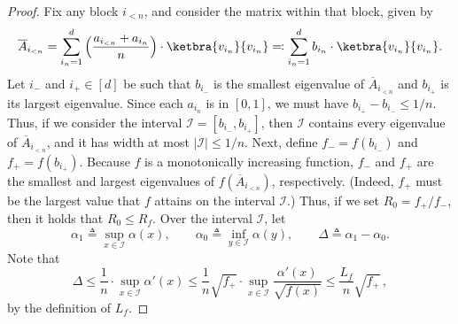 \documentclass[10pt]{article}
\newcommand{\lift}[1]{\overline{#1}}
\begin{document}
\begin{proof}
    Fix any block $i_{<n}$, and consider the matrix within that block, given by
    \begin{equation*}
        \lift{A}_{i_{< n}} = \sum_{i_n=1}^d \Big(\frac{a_{i_{<n}} + a_{i_n}}{n}\Big)\cdot \ketbra{v_{i_n}}{v_{i_n}}
        \eqqcolon \sum_{i_n=1}^d b_{i_n} \cdot \ketbra{v_{i_n}}{v_{i_n}}.
    \end{equation*}
    Let $i_-$ and $i_+ \in [d]$ be such that $b_{i_-}$ is the smallest eigenvalue of $\lift{A}_{i_{<n}}$ and $b_{i_+}$ is its largest eigenvalue.
    Since each $a_{i_n}$ is in $[0, 1]$, we must have $b_{i_+} - b_{i_-} \leq 1/n$.
    Thus, if we consider the interval $\mathcal{I} = [b_{i_-}, b_{i_+}]$, then $\mathcal{I}$ contains every eigenvalue of $\lift{A}_{i_{< n}}$, and it has width at most $|\mathcal{I}| \leq 1/n$.
    Next, define $f_- = f(b_{i_-})$ and $f_+ = f(b_{i_+})$.
    Because $f$ is a monotonically increasing function, $f_-$ and $f_+$ are the smallest and largest eigenvalues of $f(\lift{A}_{i_{< n}})$, respectively.
    (Indeed, $f_+$ must be the largest value that $f$ attains on the interval $\mathcal{I}$.)
    Thus, if we set $R_0 = f_+ / f_-$, then it holds that $R_0 \le R_f$.
    Over the interval $\mathcal{I}$, let
    \begin{equation}
        \alpha_1 \triangleq \sup_{x\in\mathcal{I}} \alpha(x),
        \qquad \alpha_0 \triangleq \inf_{y\in\mathcal{I}} \alpha(y),
        \qquad \Delta \triangleq \alpha_1 - \alpha_0.
    \end{equation} 
    Note that
    \begin{equation}\label{eq:delta-inequality}
        \Delta
        \le \frac{1}{n}\cdot \sup_{x\in\mathcal{I}}\alpha'(x)
        \le \frac{1}{n}\sqrt{f_+}\cdot \sup_{x\in\mathcal{I}}\frac{\alpha'(x)}{\sqrt{f(x)}}
        \le \frac{L_f}{n}\sqrt{f_+}\,,
    \end{equation}
    by the definition of $L_f$.


\end{proof}
\end{document}
